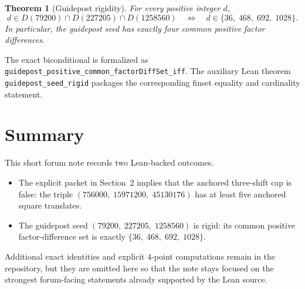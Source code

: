 \documentclass[11pt]{article}
\theoremstyle{plainbreak}
\newtheorem{theorem}{Theorem}[section]
\theoremstyle{defbreak}
\begin{document}
\begin{theorem}[Guidepost rigidity]\label{thm:rigid}
For every positive integer $d$,
\[
  d \in D(79200)\cap D(227205)\cap D(1258560)
  \quad\Longleftrightarrow\quad
  d \in \{36,\;468,\;692,\;1028\}.
\]
In particular, the guidepost seed has exactly four common positive factor
differences.
\end{theorem}
\noindent The exact biconditional is formalized as
\texttt{guidepost\_positive\_common\_factorDiffSet\_iff}.
The auxiliary Lean theorem \texttt{guidepost\_seed\_rigid} packages the
corresponding finset equality and cardinality statement.

\section{Summary}

This short forum note records two Lean-backed outcomes.
\begin{itemize}[nosep]
  \item The explicit packet in Section~2 implies that the anchored
    three-shift cap is false: the triple
    $(756000,\;15971200,\;45130176)$ has at least five anchored square
    translates.
  \item The guidepost seed
    $(79200,\;227205,\;1258560)$ is rigid: its common positive
    factor-difference set is exactly
    $\{36,\;468,\;692,\;1028\}$.
\end{itemize}
Additional exact identities and explicit $4$-point computations remain in
the repository, but they are omitted here so that the note stays focused on
the strongest forum-facing statements already supported by the Lean source.
\end{document}
